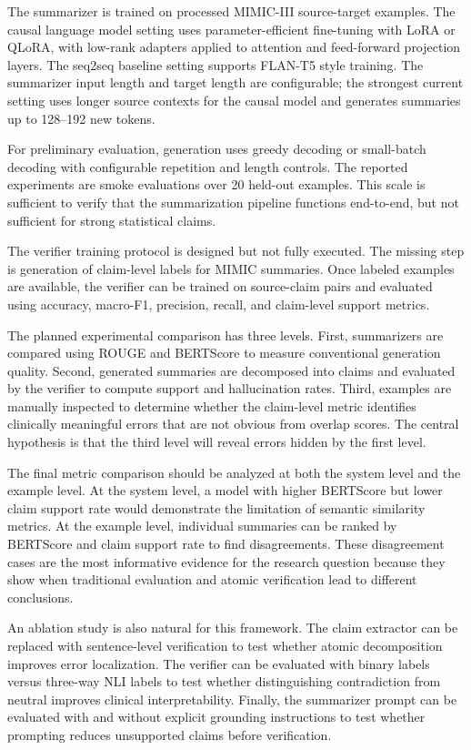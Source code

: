 \documentclass[11pt]{article}
\begin{document}
The summarizer is trained on processed MIMIC-III source-target examples. The causal language model setting uses parameter-efficient fine-tuning with LoRA or QLoRA, with low-rank adapters applied to attention and feed-forward projection layers. The seq2seq baseline setting supports FLAN-T5 style training. The summarizer input length and target length are configurable; the strongest current setting uses longer source contexts for the causal model and generates summaries up to 128--192 new tokens.

For preliminary evaluation, generation uses greedy decoding or small-batch decoding with configurable repetition and length controls. The reported experiments are smoke evaluations over 20 held-out examples. This scale is sufficient to verify that the summarization pipeline functions end-to-end, but not sufficient for strong statistical claims.

The verifier training protocol is designed but not fully executed. The missing step is generation of claim-level labels for MIMIC summaries. Once labeled examples are available, the verifier can be trained on source-claim pairs and evaluated using accuracy, macro-F1, precision, recall, and claim-level support metrics.

The planned experimental comparison has three levels. First, summarizers are compared using ROUGE and BERTScore to measure conventional generation quality. Second, generated summaries are decomposed into claims and evaluated by the verifier to compute support and hallucination rates. Third, examples are manually inspected to determine whether the claim-level metric identifies clinically meaningful errors that are not obvious from overlap scores. The central hypothesis is that the third level will reveal errors hidden by the first level.

The final metric comparison should be analyzed at both the system level and the example level. At the system level, a model with higher BERTScore but lower claim support rate would demonstrate the limitation of semantic similarity metrics. At the example level, individual summaries can be ranked by BERTScore and claim support rate to find disagreements. These disagreement cases are the most informative evidence for the research question because they show when traditional evaluation and atomic verification lead to different conclusions.

An ablation study is also natural for this framework. The claim extractor can be replaced with sentence-level verification to test whether atomic decomposition improves error localization. The verifier can be evaluated with binary labels versus three-way NLI labels to test whether distinguishing contradiction from neutral improves clinical interpretability. Finally, the summarizer prompt can be evaluated with and without explicit grounding instructions to test whether prompting reduces unsupported claims before verification.
\end{document}
